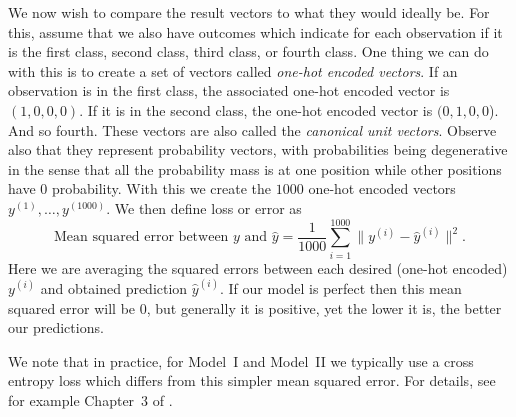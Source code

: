 We now wish to compare the result vectors to what they would ideally be. For this, assume that we also have outcomes which indicate for each observation if it is the first class, second class, third class, or fourth class. One thing we can do with this is to create a set of vectors called {\em one-hot encoded vectors}. If an observation is in the first class, the associated one-hot encoded vector is $(1,0,0,0)$. If it is in the second class, the one-hot encoded vector is $(0,1,0,0$). And so fourth. These vectors are also called the {\em canonical unit vectors}. Observe also that they represent probability vectors, with probabilities being degenerative in the sense that all the probability mass is at one position while other positions have $0$ probability. With this we create the $1000$ one-hot encoded vectors $y^{(1)}, \ldots, y^{(1000)}$. We then define loss or error as
%
\begin{equation}
 \label{eq:mse-error-class-1000}   
\text{Mean squared error between $y$ and $\hat{y}$} = \frac{1}{1000}\sum_{i=1}^{1000} \| y^{(i)} - \hat{y}^{(i)} \|^2.
\end{equation}
%
Here we are averaging the squared errors between each desired (one-hot encoded) $y^{(i)}$ and obtained prediction $\hat{y}^{(i)}$. If our model is perfect then this mean squared error will be $0$, but generally it is positive, yet the lower it is, the better our predictions.

We note that in practice, for Model~I and Model~II we typically use a cross entropy loss which differs from this simpler mean squared error. For details, see for example Chapter~3 of  \cite{LiquetMokaNazarathy2024DeepLearning}.
